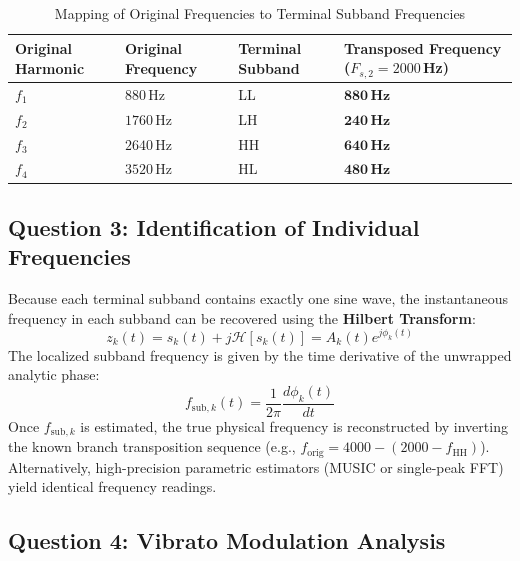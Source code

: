 \documentclass{rapportCS}
\begin{document}
\begin{table}[H]
    \centering
    \caption{Mapping of Original Frequencies to Terminal Subband Frequencies}
    \label{tab:filter_bank_transposition}
    \begin{tabularx}{\textwidth}{XXXX}
        \toprule
        \textbf{Original Harmonic} & \textbf{Original Frequency} & \textbf{Terminal Subband} & \textbf{Transposed Frequency ($F_{s,2}=2000$\,Hz)} \\
        \midrule
        $f_1$ & $880$\,Hz  & LL & $\mathbf{880\,\text{Hz}}$ \\
        $f_2$ & $1760$\,Hz & LH & $\mathbf{240\,\text{Hz}}$ \\
        $f_3$ & $2640$\,Hz & HH & $\mathbf{640\,\text{Hz}}$ \\
        $f_4$ & $3520$\,Hz & HL & $\mathbf{480\,\text{Hz}}$ \\
        \bottomrule
    \end{tabularx}
\end{table}

\subsection{Question 3: Identification of Individual Frequencies}

Because each terminal subband contains exactly one sine wave, the instantaneous frequency in each subband can be recovered using the \textbf{Hilbert Transform}:
\begin{equation}
    z_k(t) = s_k(t) + j \mathcal{H}[s_k(t)] = A_k(t) e^{j \phi_k(t)}
\end{equation}
The localized subband frequency is given by the time derivative of the unwrapped analytic phase:
\begin{equation}
    f_{\text{sub}, k}(t) = \frac{1}{2\pi} \frac{d\phi_k(t)}{dt}
\end{equation}
Once $f_{\text{sub}, k}$ is estimated, the true physical frequency is reconstructed by inverting the known branch transposition sequence (e.g., $f_{\text{orig}} = 4000 - (2000 - f_{\text{HH}})$). Alternatively, high-precision parametric estimators (MUSIC or single-peak FFT) yield identical frequency readings.

\subsection{Question 4: Vibrato Modulation Analysis}
\end{document}
